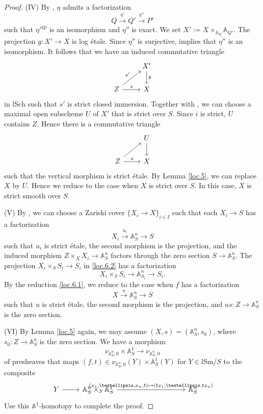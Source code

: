 \documentclass[10pt]{amsart}
\theoremstyle{definition}
\theoremstyle{remark}
\numberwithin{equation}{subsection}
\newcommand{\A}{\mathbb{A}}
\newcommand{\lSch}{\mathrm{lSch}}
\newcommand{\lSm}{\mathrm{lSm}}
\newcommand{\gp}{\mathrm{gp}}
\begin{document}
\begin{proof}
(IV)
By \cite[Proposition I.4.2.17]{Ogu}, $\eta$ admits a factorization
\[
Q\xrightarrow{\eta'} Q'\xrightarrow{\eta''} P'
\]
such that $\eta'^\gp$ is an isomorphism and $\eta''$ is exact.
We set $X':=X\times_{\A_Q}\A_{Q'}$.
The projection $g\colon X'\to X$ is log \'etale.
Since $\overline{\eta''}$ is surjective, \cite[Proposition I.4.2.1(3),(5)]{Ogu} implies that $\overline{\eta''}$ is an isomorphism.
It follows that we have an induced commutative triangle
\[
\begin{tikzcd}
&X'\arrow[d,"g"]\\
Z\arrow[r,"s"]\arrow[ru,"s'"]&X
\end{tikzcd}
\]
in $\lSch$ such that $s'$ is strict closed immersion.
Together with \cite[Lemma A.11.2]{logDM}, we can choose a maximal open subscheme $U$ of $X'$ that is strict over $S$.
Since $i$ is strict, $U$ contains $Z$.
Hence there is a commutative triangle
\[
\begin{tikzcd}
&U\arrow[d]\\
Z\arrow[r,"s"]\arrow[ru]&X
\end{tikzcd}
\]
such that the vertical morphism is strict \'etale.
By Lemma \ref{loc.5}, we can replace $X$ by $U$.
Hence we reduce to the case when $X$ is strict over $S$.
In this case, $X$ is strict smooth over $S$.

(V) By \cite[Corollaire IV.17.12.2(d)]{EGA}, we can choose a Zariski cover $\{X_i\to X\}_{i\in I}$ such that each $X_i\to S$ has a factorization
\[
X_i\xrightarrow{u_i} \A_S^n \to S
\]
such that $u_i$ is strict \'etale, the second morphism is the projection,
and the induced morphism $Z\times_X X_i\to \A_S^n$ factors through the zero section $S\to \A_S^n$.
The projection $X_i\times_S S_i \to S_i$ in \eqref{loc.6.2} has a factorization
\[
X_i\times_S S_i \to \A_{S_i}^n \to S_i.
\]
By the reduction \eqref{loc.6.1}, we reduce to the case when $f$ has a factorization
\[
X\xrightarrow{u}\A_S^n\to S
\]
such that $u$ is strict \'etale, the second morphism is the projection, and $us\colon Z\to \A_S^n$ is the zero section.

(VI)
By Lemma \ref{loc.5} again, we may assume $(X,s)=(\mathbb{A}_S^n,s_0)$, where $s_0\colon Z\rightarrow \mathbb{A}_S^n$ is the zero section.
We have a morphism
\begin{equation}
\label{loc.6.3}
\nu_{\mathbb{A}_S^n,0}\times\mathbb{A}_S^1
\to
\nu_{\mathbb{A}_S^n,0}
\end{equation}
of presheaves that maps $(f,t)\in \nu_{\mathbb{A}_S^n,0}(Y)\times\mathbb{A}_S^1(Y)$ for $Y\in \lSm/S$ to the composite
\[
\begin{tikzcd}
Y\arrow{r}&\mathbb{A}_S^n
\times_S\mathbb{A}_S^1\arrow{rrrr}{(x_1,\ldots,x_n,t)\mapsto
(tx_1,\ldots,tx_n)}&&&&\mathbb{A}_S^n
\end{tikzcd}
\]
Use this $\A^1$-homotopy to complete the proof.
\end{proof}
\end{document}
